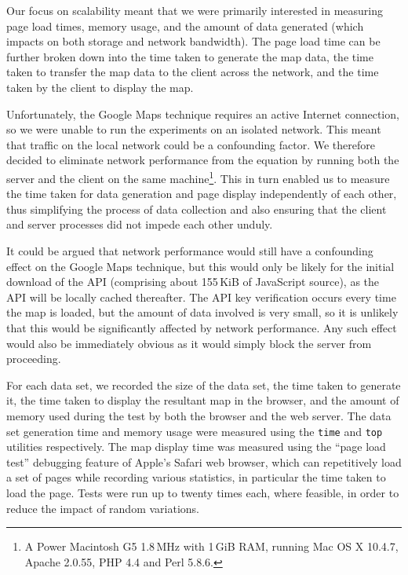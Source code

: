 \documentclass[acmtocl,acmnow]{acmtrans2m}
\begin{document}
Our focus on scalability meant that we were primarily interested in
measuring page load times, memory usage, and the amount of data
generated (which impacts on both storage and network bandwidth). The
page load time can be further broken down into the time taken to
generate the map data, the time taken to transfer the map data to the
client across the network, and the time taken by the client to display
the map.

Unfortunately, the Google Maps technique requires an active Internet
connection, so we were unable to run the experiments on an isolated
network. This meant that traffic on the local network could be a
confounding factor. We therefore decided to eliminate network
performance from the equation by running both the server and the client
on the same machine\footnote{A Power Macintosh G5 1.8\,MHz with 1\,GiB
RAM, running Mac OS X 10.4.7, Apache 2.0.55, PHP 4.4 and Perl 5.8.6.}.
This in turn enabled us to measure the time taken for data generation
and page display independently of each other, thus simplifying the
process of data collection and also ensuring that the client and server
processes did not impede each other unduly.

It could be argued that network performance would still have a
confounding effect on the Google Maps technique, but this would only be
likely for the initial download of the API (comprising about 155\,KiB of
JavaScript source), as the API will be locally cached thereafter. The
API key verification occurs every time the map is loaded, but the amount
of data involved is very small, so it is unlikely that this would be
significantly affected by network performance. Any such effect would
also be immediately obvious as it would simply block the server from
proceeding.

For each data set, we recorded the size of the data set, the time taken
to generate it, the time taken to display the resultant map in the
browser, and the amount of memory used during the test by both the
browser and the web server. The data set generation time and memory
usage were measured using the \texttt{time} and \texttt{top} utilities
respectively. The map display time was measured using the ``page load
test'' debugging feature of Apple's Safari web browser, which can
repetitively load a set of pages while recording various statistics, in
particular the time taken to load the page. Tests were run up to twenty
times each, where feasible, in order to reduce the impact of random
variations.

\end{document}
